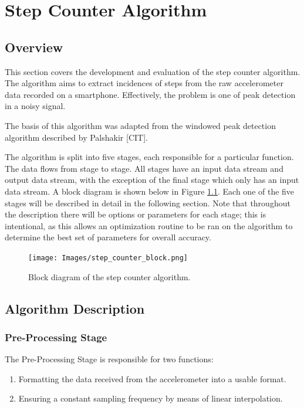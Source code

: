 \part{Step Counter Algorithm}

    \chapter{Overview}

        This section covers the development and evaluation of the step counter algorithm. The algorithm aims to extract incidences of steps from the raw accelerometer data recorded on a smartphone. Effectively, the problem is one of peak detection in a noisy signal.

        The basis of this algorithm was adapted from the windowed peak detection algorithm described by Palshakir [CIT].

        The algorithm is split into five stages, each responsible for a particular function. The data flows from stage to stage. All stages have an input data stream and output data stream, with the exception of the final stage which only has an input data stream. A block diagram is shown below in Figure \ref{img_sc_block}. Each one of the five stages will be described in detail in the following section. Note that throughout the description there will be options or parameters for each stage; this is intentional, as this allows an optimization routine to be ran on the algorithm to determine the best set of parameters for overall accuracy. 

        \begin{figure}[h]
            \texttt{[image: Images/step\_counter\_block.png]}
            \centering
            \caption{Block diagram of the step counter algorithm.}
            \label{img_sc_block}
        \end{figure}

    \chapter{Algorithm Description}

        \section{Pre-Processing Stage}

            The Pre-Processing Stage is responsible for two functions:

            \begin{enumerate}
                \item Formatting the data received from the accelerometer into a usable format.
                \item Ensuring a constant sampling frequency by means of linear interpolation.
            \end{enumerate}

